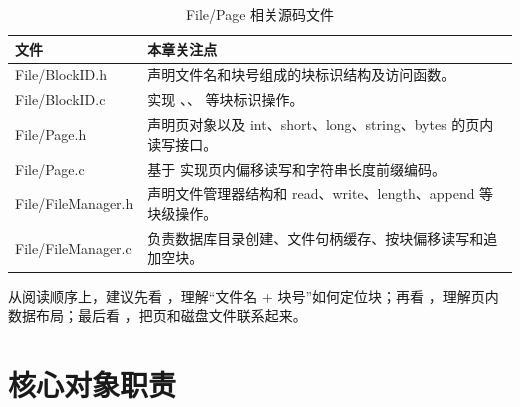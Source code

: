 \begin{table}[htbp]
  \centering
  \caption{File/Page 相关源码文件}
  \label{tab:file-page-source-files}
  \begin{tabularx}{\textwidth}{>{\ttfamily}l Y}
    \toprule
    文件 & 本章关注点 \\
    \midrule
    File/BlockID.h & 声明文件名和块号组成的块标识结构及访问函数。\\
    File/BlockID.c & 实现 、、 等块标识操作。\\
    File/Page.h & 声明页对象以及 int、short、long、string、bytes 的页内读写接口。\\
    File/Page.c & 基于  实现页内偏移读写和字符串长度前缀编码。\\
    File/FileManager.h & 声明文件管理器结构和 read、write、length、append 等块级操作。\\
    File/FileManager.c & 负责数据库目录创建、文件句柄缓存、按块偏移读写和追加空块。\\
    \bottomrule
  \end{tabularx}
\end{table}

从阅读顺序上，建议先看 ，理解“文件名 + 块号”如何定位块；再看 ，理解页内数据布局；最后看 ，把页和磁盘文件联系起来。

\section{核心对象职责}
\label{sec:file-page-objects}


